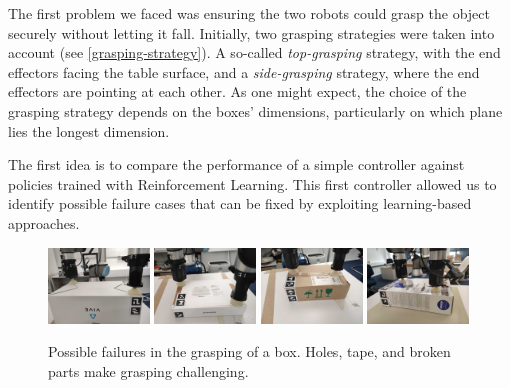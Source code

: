 \documentclass[letterpaper, 10 pt, conference]{ieeeconf}  %
\begin{document}
The first problem we faced was ensuring the two robots could grasp the object securely without letting it fall.
Initially, two grasping strategies were taken into account (see  \cref{grasping-strategy}).
A so-called \textit{top-grasping} strategy, with the end effectors facing the table surface, and a \textit{side-grasping} strategy, where the end effectors are pointing at each other. 
As one might expect, the choice of the grasping strategy depends on the boxes' dimensions, particularly on which plane lies the longest dimension.

The first idea is to compare the performance of a simple controller against policies trained with Reinforcement Learning. This first controller allowed us to identify possible failure cases that can be fixed by exploiting learning-based approaches. 

\begin{figure}[t]
    \centering
    \includegraphics[width=0.24\textwidth]{images/IMG_20250411_100113.jpg}
    \includegraphics[width=0.24\textwidth]{images/IMG_20250411_100317.jpg}
    \includegraphics[width=0.24\textwidth]{images/IMG_20250411_100932.jpg}
    \includegraphics[width=0.24\textwidth]{images/IMG_20250414_103423.jpg}
    \caption{Possible failures in the grasping of a box. Holes, tape, and broken parts make grasping challenging.}
    \label{failures}
\end{figure}
\end{document}
